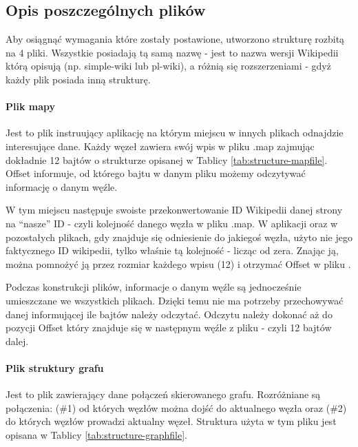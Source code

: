 \subsection{Opis poszczególnych plików}
Aby osiągnąć wymagania które zostały postawione, utworzono strukturę rozbitą na 4 pliki. Wszystkie posiadają tą samą nazwę - jest to nazwa wersji Wikipedii którą opisują (np. simple-wiki lub pl-wiki), a różnią się rozszerzeniami - gdyż każdy plik posiada inną strukturę.

\paragraph{Plik mapy }
Jest to plik instruujący aplikację na którym miejscu w innych plikach odnajdzie interesujące dane. Każdy węzeł zawiera swój wpis w pliku .map zajmując dokładnie 12 bajtów o strukturze opisanej w Tablicy \ref{tab:structure-mapfile}. Offset informuje, od którego bajtu w danym pliku możemy odczytywać informację o danym węźle.


W tym miejscu następuje swoiste przekonwertowanie ID Wikipedii danej strony na “nasze” ID - czyli kolejność danego węzła w pliku .map. W aplikacji oraz w pozostałych plikach, gdy znajduje się odniesienie do jakiegoś węzła, użyto nie jego faktycznego ID wikipedii, tylko właśnie tą kolejność - licząc od zera. Znając ją, można pomnożyć ją przez rozmiar każdego wpisu (12) i otrzymać Offset w pliku .

Podczas konstrukcji plików, informacje o danym węźle są jednocześnie umieszczane we wszystkich plikach. Dzięki temu nie ma potrzeby przechowywać danej informującej ile bajtów należy odczytać. Odczytu należy dokonać aż do pozycji Offset który znajduje się w następnym węźle z pliku  - czyli 12 bajtów dalej.

\paragraph{Plik struktury grafu }

Jest to plik zawierający dane połączeń skierowanego grafu. Rozróżniane są połączenia: (\#1) od których węzłów można dojść do aktualnego węzła oraz (\#2) do których węzłów prowadzi aktualny węzeł. Struktura użyta w tym pliku jest opisana w Tablicy \ref{tab:structure-graphfile}.


